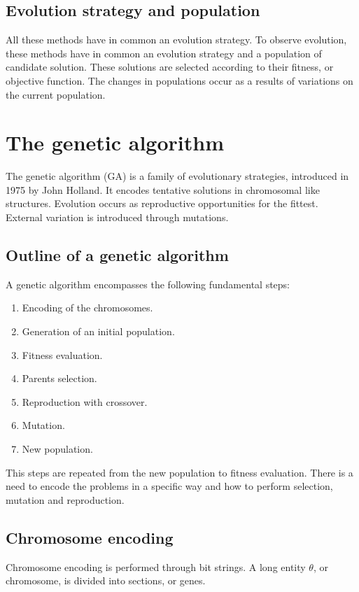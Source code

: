   \subsection{Evolution strategy and population}
  All these methods have in common an evolution strategy.
  To observe evolution, these methods have in common an evolution strategy and a population of candidate solution.
  These solutions are selected according to their fitness, or objective function.
  The changes in populations occur as a results of variations on the current population.

\section{The genetic algorithm}
The genetic algorithm (GA) is a family of evolutionary strategies, introduced in 1975 by John Holland.
It encodes tentative solutions in chromosomal like structures.
Evolution occurs as reproductive opportunities for the fittest.
External variation is introduced through mutations.

  \subsection{Outline of a genetic algorithm}
  A genetic algorithm encompasses the following fundamental steps:

  \begin{multicols}{2}
    \begin{enumerate}
      \item Encoding of the chromosomes.
      \item Generation of an initial population.
      \item Fitness evaluation.
      \item Parents selection.
      \item Reproduction with crossover.
      \item Mutation.
      \item New population.
    \end{enumerate}
  \end{multicols}

  This steps are repeated from the new population to fitness evaluation.
  There is a need to encode the problems in a specific way and how to perform selection, mutation and reproduction.

  \subsection{Chromosome encoding}
  Chromosome encoding is performed through bit strings.
  A long entity \(\theta\), or chromosome, is divided into sections, or genes.

